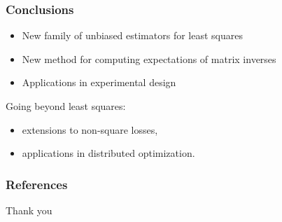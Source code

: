 \documentclass{beamer}
\begin{document}
\begin{frame}
  \frametitle{Conclusions}
  \begin{itemize}
  \item New family of unbiased estimators for least squares
  \item New method for computing expectations of matrix inverses
  \item Applications in experimental design
  \end{itemize}
  \pause\vspace{3mm}
  
Going beyond least squares:
  \begin{itemize}
  \item extensions to non-square losses,
  \item applications in distributed optimization.
  \end{itemize}
\end{frame}

\begin{frame}[allowframebreaks]
  \frametitle{References}
  \scriptsize 
  
  
\end{frame}

\begin{frame}
\centering  \Large Thank you
\end{frame}
\end{document}
